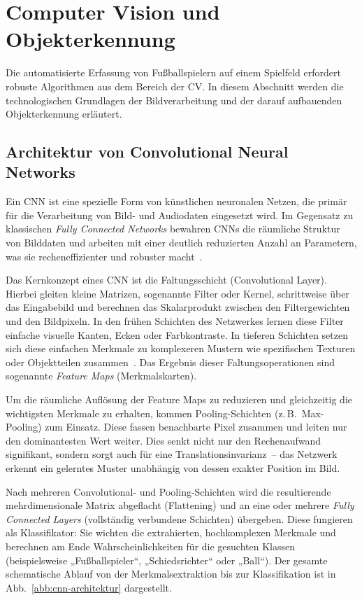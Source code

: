 \section{Computer Vision und Objekterkennung}

Die automatisierte Erfassung von Fußballspielern auf einem Spielfeld erfordert robuste Algorithmen aus dem 
Bereich der \ac{CV}. In diesem Abschnitt werden die technologischen Grundlagen der Bildverarbeitung und der 
darauf aufbauenden Objekterkennung erläutert.

\subsection{Architektur von Convolutional Neural Networks}

Ein \ac{CNN} ist eine spezielle Form von künstlichen neuronalen Netzen, die primär für die Verarbeitung von 
Bild- und Audiodaten eingesetzt wird. Im Gegensatz zu klassischen \textit{Fully Connected Networks} bewahren
\acp{CNN} die räumliche Struktur von Bilddaten und arbeiten mit einer deutlich reduzierten Anzahl an 
Parametern, was sie recheneffizienter und robuster macht~\cite{goodfellow2016deep}.

Das Kernkonzept eines \ac{CNN} ist die Faltungsschicht (Convolutional Layer). Hierbei gleiten kleine Matrizen, 
sogenannte Filter oder Kernel, schrittweise über das Eingabebild und berechnen das Skalarprodukt zwischen 
den Filtergewichten und den Bildpixeln. In den frühen Schichten des Netzwerkes lernen diese Filter einfache 
visuelle Kanten, Ecken oder Farbkontraste. In tieferen Schichten setzen sich diese einfachen Merkmale zu 
komplexeren Mustern wie spezifischen Texturen oder Objektteilen zusammen~\cite{goodfellow2016deep}. Das 
Ergebnis dieser Faltungsoperationen sind sogenannte \textit{Feature Maps} (Merkmalskarten).

Um die räumliche Auflösung der Feature Maps zu reduzieren und gleichzeitig die wichtigsten Merkmale zu 
erhalten, kommen Pooling-Schichten (z.\,B.\ Max-Pooling) zum Einsatz. Diese fassen benachbarte Pixel 
zusammen und leiten nur den dominantesten Wert weiter. Dies senkt nicht nur den Rechenaufwand signifikant, 
sondern sorgt auch für eine Translationsinvarianz~-- das Netzwerk erkennt ein gelerntes Muster unabhängig 
von dessen exakter Position im Bild.

Nach mehreren Convolutional- und Pooling-Schichten wird die resultierende mehrdimensionale Matrix 
abgeflacht (Flattening) und an eine oder mehrere \textit{Fully Connected Layers} 
(vollständig verbundene Schichten) übergeben. Diese fungieren als Klassifikator: Sie wichten die 
extrahierten, hochkomplexen Merkmale und berechnen am Ende Wahrscheinlichkeiten für die gesuchten Klassen 
(beispielsweise „Fußballspieler“, „Schiedsrichter“ oder „Ball“). Der gesamte schematische Ablauf von der 
Merkmalsextraktion bis zur Klassifikation ist in Abb.~\ref{abb:cnn-architektur} dargestellt.

